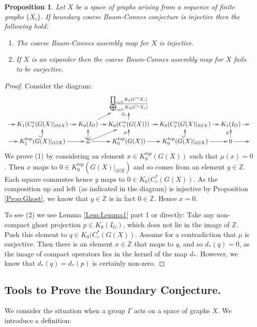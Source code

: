 \documentclass[11pt]{amsart}
\theoremstyle{plain}
\newtheorem{proposition}[theorem]{Proposition}%
\theoremstyle{definition}%
\theoremstyle{remark}%
\begin{document}
\begin{proposition}\label{Prop:Cor}
Let $X$ be a space of graphs arising from a sequence of finite graphs $\lbrace X_{i} \rbrace$. If  boundary coarse Baum-Connes conjecture is injective then the following hold:
\begin{enumerate}
\item The coarse Baum-Connes assembly map for $X$ is injective.
\item If $X$ is an expander then the coarse Baum-Connes assembly map for $X$ fails to be surjective.
\end{enumerate}
\end{proposition}
\begin{proof}
Consider the diagram:
$$
\xymatrix@=1em{& & & \frac{\prod_{i\in\mathbb{N}}K_{0}(C^{*}X_{i})}{\bigoplus_{i\in\mathbb{N}}K_{0}(C^{*}X_{i})}& & &\\
\ar[r] & K_{1}(C^{*}_{r}(G(X)|_{\partial\beta X}) \ar[r] & K_{0}(I_{G})\ar[ur] \ar[r]& K_{0}(C^{*}_{r}(G(X)))\ar[u]^{d_{*}} \ar[r]& K_{0}(C^{*}_{r}(G(X)|_{\partial\beta X})\ar[r] & K_{1}(I_{G}) \ar[r] & \\
\ar[r] & K_{1}^{top}(G(X)|_{\partial\beta X}) \ar[r] \ar@{^{(}->}[u]& \mathbb{Z} \ar@{^{(}->}[ur] \ar[r]\ar@{^{(}->}[u]& K_{0}^{top}(G(X)) \ar[r]\ar[u]^{\mu}& K_{0}^{top}(G(X)|_{\partial\beta X}) \ar[r]\ar@{^{(}->}[u]& 0\ar[u]^{0} \ar[r] & 
}
$$
We prove (1) by considering an element $x \in K_{0}^{top}(G(X))$ such that $\mu(x)=0$. Then $x$ maps to $0\in K_{0}^{top}(G(X)|_{\partial\beta X})$ and so comes from an element $y \in \mathbb{Z}$. Each square commutes hence $y$ maps to $0 \in K_{0}(C^{*}_{r}(G(X))$. As the composition up and left (as indicated in the diagram) is injective by Proposition \ref{Prop:Ghost}, we know that $y \in \mathbb{Z}$  is in fact $0 \in \mathbb{Z}$. Hence $x=0$.

To see (2) we use Lemma \ref{Lem:Lemma1} part 1 or directly: Take any non-compact ghost projection $p \in K_{0}(I_{G})$, which does not lie in the image of $\mathbb{Z}$. Push this element to $q \in K_{0}(C^{*}_{r}(G(X))$. Assume for a contradiction that $\mu$ is surjective. Then there is an element $x \in \mathbb{Z}$ that maps to $q$, and so $d_{*}(q)=0$, as the image of compact operators lies in the kernel of the map $d_{*}$. However, we know that $d_{*}(q)=d_{*}(p)$ is certainly non-zero.
\end{proof}

\subsection{Tools to Prove the Boundary Conjecture.}
We consider the situation when a group $\Gamma$ acts on a space of graphs $X$. We introduce a definition:
\end{document}
